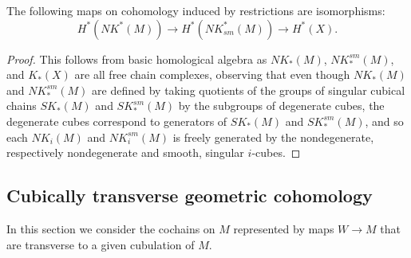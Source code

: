 \begin{corollary}
	The following maps on cohomology induced by restrictions are isomorphisms: $$H^*(NK^*(M)) \to H^*(NK_{sm}^*(M)) \to H^*(X).$$
\end{corollary}

\begin{proof}
	This follows from basic homological algebra \cite[Theorem 45.5]{Mun84} as $NK_*(M)$, $NK^{sm}_*(M)$, and $K_*(X)$ are all free chain complexes, observing that even though $NK_*(M)$ and $NK^{sm}_*(M)$ are defined by taking quotients of the groups of singular cubical chains $SK_*(M)$ and $SK^{sm}_*(M)$ by the subgroups of degenerate cubes, the degenerate cubes correspond to generators of $SK_*(M)$ and $SK^{sm}_*(M)$, and so each $NK_i(M)$ and $NK^{sm}_i(M)$ is freely generated by the nondegenerate, respectively nondegenerate and smooth, singular $i$-cubes.
\end{proof}

\subsection{Cubically transverse geometric cohomology}\label{S: transverse cochains}

In this section we consider the cochains on $M$ represented by maps $W \to M$ that are transverse to a given cubulation of $M$.

